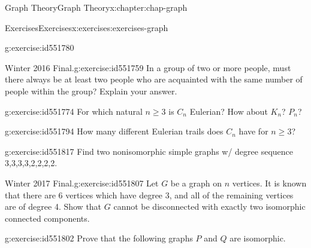 \documentclass[oneside,10pt,]{book}
\numberwithin{equation}{section}
\begin{document}
\begin{chapterptx}{Graph Theory}{}{Graph Theory}{}{}{x:chapter:chap-graph}
\begin{exercises-section}{Exercises}{}{Exercises}{}{}{x:exercises:exercises-graph}
\begin{divisionexercise}{6}{}{}{g:exercise:id551780}
\end{divisionexercise}%
\begin{divisionexercise}{7}{Winter 2016 Final.}{}{g:exercise:id551759}%
In a group of two or more people, must there always be at least two people who are acquainted with the same number of people within the group? Explain your answer.%
\end{divisionexercise}%
\begin{divisionexercise}{8}{}{}{g:exercise:id551774}%
For which natural \(n \geq 3\) is \(C_n\) Eulerian? How about \(K_n\)? \(P_n\)?%
\end{divisionexercise}%
\begin{divisionexercise}{9}{}{}{g:exercise:id551794}%
How many different Eulerian trails does \(C_n\) have for \(n \geq 3\)?%
\end{divisionexercise}%
\begin{divisionexercise}{10}{}{}{g:exercise:id551817}%
Find two nonisomorphic simple graphs w\slash{} degree sequence 3,3,3,3,2,2,2,2.%
\end{divisionexercise}%
\begin{divisionexercise}{11}{Winter 2017 Final.}{}{g:exercise:id551807}%
Let \(G\) be a graph on \(n\) vertices. It is known that there are 6 vertices which have degree 3, and all of the remaining vertices are of degree 4. Show that \(G\) cannot be disconnected with exactly two isomorphic connected components.%
\end{divisionexercise}%
\begin{divisionexercise}{12}{}{}{g:exercise:id551802}%
Prove that the following graphs \(P\) and \(Q\) are isomorphic.%
\begin{sidebyside}{2}{0.25}{0.25}{0.04}%
\begin{sbspanel}{0.24}%
\end{sbspanel}
\end{sidebyside}
\end{divisionexercise}
\end{exercises-section}
\end{chapterptx}
\end{document}
